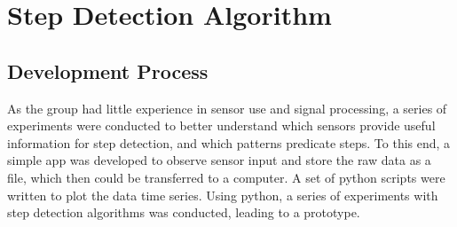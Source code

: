 \chapter{Step Detection Algorithm}

\section{Development Process}
As the group had little experience in sensor use and signal processing, a series of experiments were conducted to better understand which sensors provide useful information for step detection, and which patterns predicate steps. To this end, a simple app was developed to observe sensor input and store the raw data as a file, which then could be transferred to a computer. A set of python scripts were written to plot  the data time series. Using python, a series of experiments with step detection algorithms was conducted, leading to a prototype.
